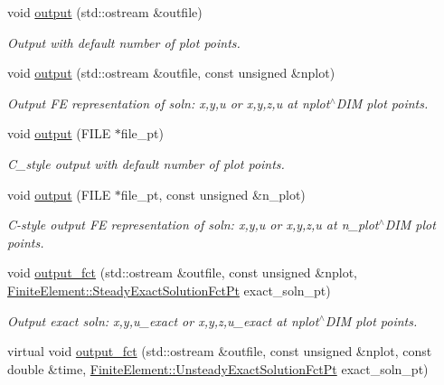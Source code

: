 \begin{DoxyCompactItemize}
void \hyperlink{classoomph_1_1AdvectionDiffusionEquations_a3016c7a56e7f7178b4d9ae8604d0c10b}{output} (std\+::ostream \&outfile)
\begin{DoxyCompactList}\small\item\em Output with default number of plot points. \end{DoxyCompactList}\item 
void \hyperlink{classoomph_1_1AdvectionDiffusionEquations_ade5e445c7b99593a68fc8e42631d79be}{output} (std\+::ostream \&outfile, const unsigned \&nplot)
\begin{DoxyCompactList}\small\item\em Output FE representation of soln\+: x,y,u or x,y,z,u at nplot$^\wedge$\+D\+IM plot points. \end{DoxyCompactList}\item 
void \hyperlink{classoomph_1_1AdvectionDiffusionEquations_a063f08a2825608d32eaac5666c2ccec5}{output} (F\+I\+LE $\ast$file\+\_\+pt)
\begin{DoxyCompactList}\small\item\em C\+\_\+style output with default number of plot points. \end{DoxyCompactList}\item 
void \hyperlink{classoomph_1_1AdvectionDiffusionEquations_a03a096ff864ee53c8823b08e0d2f6091}{output} (F\+I\+LE $\ast$file\+\_\+pt, const unsigned \&n\+\_\+plot)
\begin{DoxyCompactList}\small\item\em C-\/style output FE representation of soln\+: x,y,u or x,y,z,u at n\+\_\+plot$^\wedge$\+D\+IM plot points. \end{DoxyCompactList}\item 
void \hyperlink{classoomph_1_1AdvectionDiffusionEquations_ab1d0f6bc8d3c9c9826ac1d71f1fd148f}{output\+\_\+fct} (std\+::ostream \&outfile, const unsigned \&nplot, \hyperlink{classoomph_1_1FiniteElement_a690fd33af26cc3e84f39bba6d5a85202}{Finite\+Element\+::\+Steady\+Exact\+Solution\+Fct\+Pt} exact\+\_\+soln\+\_\+pt)
\begin{DoxyCompactList}\small\item\em Output exact soln\+: x,y,u\+\_\+exact or x,y,z,u\+\_\+exact at nplot$^\wedge$\+D\+IM plot points. \end{DoxyCompactList}\item 
virtual void \hyperlink{classoomph_1_1AdvectionDiffusionEquations_affb6feff30ffb8617315e555e1bb7185}{output\+\_\+fct} (std\+::ostream \&outfile, const unsigned \&nplot, const double \&time, \hyperlink{classoomph_1_1FiniteElement_ad4ecf2b61b158a4b4d351a60d23c633e}{Finite\+Element\+::\+Unsteady\+Exact\+Solution\+Fct\+Pt} exact\+\_\+soln\+\_\+pt)

\end{DoxyCompactItemize}
